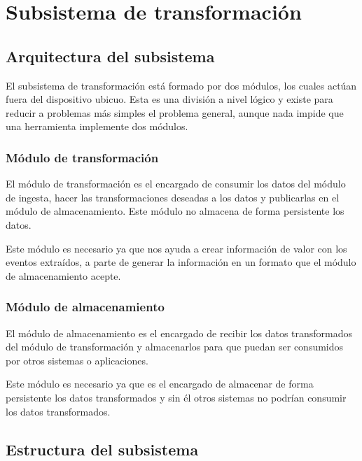 \chapter{Subsistema de transformación}

\section{Arquitectura del subsistema}

El subsistema de transformación está formado por dos módulos, los cuales actúan fuera del dispositivo ubicuo. Esta es una división a nivel lógico y existe para reducir a problemas más simples el problema general, aunque nada impide que una herramienta implemente dos módulos.

\subsection{Módulo de transformación}

El módulo de transformación es el encargado de consumir los datos del módulo de ingesta, hacer las transformaciones deseadas a los datos y publicarlas en el módulo de almacenamiento. Este módulo no almacena de forma persistente los datos.

Este módulo es necesario ya que nos ayuda a crear información de valor con los eventos extraídos, a parte de generar la información en un formato que el módulo de almacenamiento acepte.

\subsection{Módulo de almacenamiento}

El módulo de almacenamiento es el encargado de recibir los datos transformados del módulo de transformación y almacenarlos para que puedan ser consumidos por otros sistemas o aplicaciones.

Este módulo es necesario ya que es el encargado de almacenar de forma persistente los datos transformados y sin él otros sistemas no podrían consumir los datos transformados.


\section{Estructura del subsistema}

